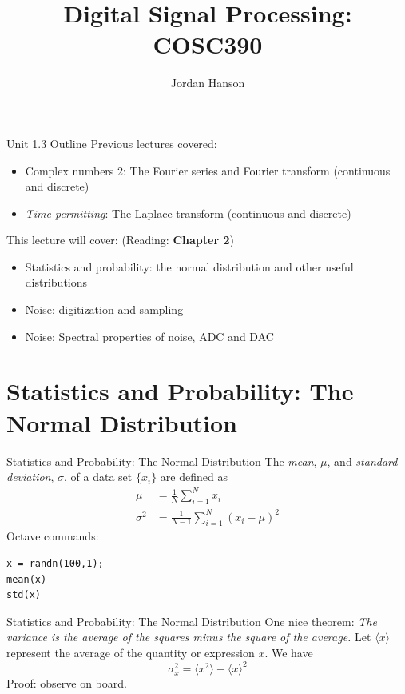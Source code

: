 \documentclass{beamer}
\title{Digital Signal Processing: COSC390}
\author{Jordan Hanson}
\institute{Whittier College Department of Physics and Astronomy}
\begin{document}
\maketitle

\begin{frame}{Unit 1.3 Outline}
Previous lectures covered:
\begin{itemize}
\item Complex numbers 2: The Fourier series and Fourier transform (continuous and discrete)
\item \textit{Time-permitting}: The Laplace transform (continuous and discrete)
\end{itemize}
This lecture will cover: (Reading: \textbf{Chapter 2})
\begin{itemize}
\item \alert{Statistics and probability: the normal distribution and other useful distributions}
\item \alert{Noise: digitization and sampling}
\item Noise: Spectral properties of noise, ADC and DAC
\end{itemize}
\end{frame}

\section{Statistics and Probability: The Normal Distribution}

\begin{frame}[fragile]{Statistics and Probability: The Normal Distribution}
The \textit{mean}, $\mu$, and \textit{standard deviation}, $\sigma$, of a data set $\lbrace x_i \rbrace$ are defined as
\begin{align}
\mu &= \frac{1}{N}\sum_{i=1}^N x_i \\
\sigma^2 &= \frac{1}{N-1}\sum_{i=1}^N\left(x_i-\mu\right)^2
\end{align}
Octave commands:
\begin{verbatim}
x = randn(100,1);
mean(x)
std(x)
\end{verbatim}
\end{frame}

\begin{frame}[fragile]{Statistics and Probability: The Normal Distribution}
One nice theorem: \textit{The variance is the average of the squares minus the square of the average.}  Let $\langle x \rangle$ represent the average of the quantity or expression $x$.  We have
\begin{equation}
\sigma_x^2 = \langle x^2 \rangle - \langle x \rangle^2
\end{equation}
Proof: observe on board.
\end{frame}
\end{document}

